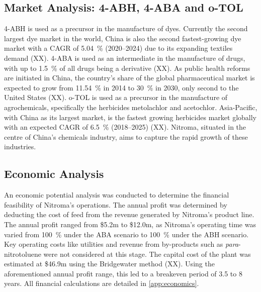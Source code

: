 \subsection{Market Analysis: 4-ABH, 4-ABA and o-TOL}
4-ABH is used as a precursor in the manufacture of dyes. Currently the second largest dye market in the world, China is also the second fastest-growing dye market with a CAGR of \SI{5.04}{\percent} (2020--2024) due to its expanding textiles demand (XX). 4-ABA is used as an intermediate in the manufacture of drugs, with up to \SI{1.5}{\percent} of all drugs being a derivative (XX). As public health reforms are initiated in China, the country’s share of the global pharmaceutical market is expected to grow from \SI{11.54}{\percent} in 2014 to \SI{30}{\percent} in 2030, only second to the United States (XX). o-TOL is used as a precursor in the manufacture of agrochemicals, specifically the herbicides metolachlor and acetochlor. Asia-Pacific, with China as its largest market, is the fastest growing herbicides market globally with an expected CAGR of \SI{6.5}{\percent} (2018--2025) (XX). Nitroma, situated in the centre of China’s chemicals industry, aims to capture the rapid growth of these industries.  

\subsection{Economic Analysis}
An economic potential analysis was conducted to determine the financial feasibility of Nitroma’s operations. The annual profit was determined by deducting the cost of feed from the revenue generated by Nitroma's product line. The annual profit ranged from \$5.2m to \$12.0m, as Nitroma's operating time was varied from \SI{100}{\percent} under the ABA scenario to \SI{100}{\percent} under the ABH scenario. Key operating costs like utilities and revenue from by-products such as \textit{para}-nitrotoluene were not considered at this stage. The capital cost of the plant was estimated at \$46.9m using the Bridgewater method (XX). Using the aforementioned annual profit range, this led to a breakeven period of 3.5 to 8 years. All financial calculations are detailed in \cref{app:economics}.